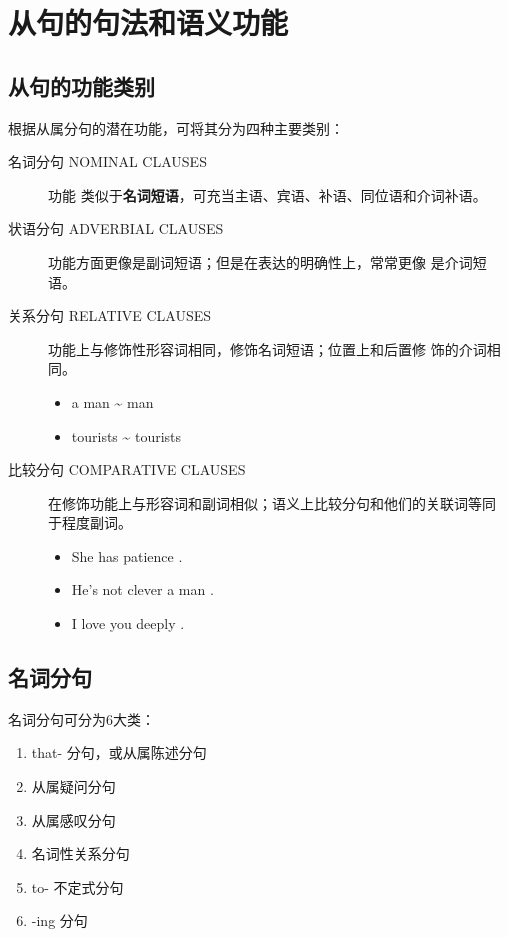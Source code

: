 \section{从句的句法和语义功能}

\subsection{从句的功能类别}

根据从属分句的潜在功能，可将其分为四种主要类别：
\begin{description}
\item[名词分句 NOMINAL CLAUSES]  功能
  类似于\textbf{名词短语}，可充当主语、宾语、补语、同位语和介词补语。

\item[状语分句 ADVERBIAL CLAUSES]  功能方面更像是副词短语；但是在表达的明确性上，常常更像
  是介词短语。

\item[关系分句 RELATIVE CLAUSES]  功能上与修饰性形容词相同，修饰名词短语；位置上和后置修
  饰的介词相同。
  \begin{itemize}
  \item a man  \~{}  man
  \item tourists  \~{} tourists 
  \end{itemize}

\item[比较分句 COMPARATIVE CLAUSES]  在修饰功能上与形容词和副词相似；语义上比较分句和他们的关联词等同
  于程度副词。
  \begin{itemize}
  \item She has  patience .
  \item He's not  clever a man .
  \item I love you  deeply .
  \end{itemize}
\end{description}

\subsection{名词分句}

名词分句可分为6大类：
\begin{enumerate}
\item that- 分句，或从属陈述分句

\item 从属疑问分句

\item 从属感叹分句

\item 名词性关系分句

\item to- 不定式分句

\item -ing 分句
\end{enumerate}

